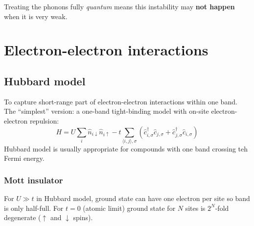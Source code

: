 \documentclass[11pt,letterpaper]{article}
\numberwithin{equation}{section} %
\newcommand{\spind}{\ensuremath{\downarrow}}
\newcommand{\spinu}{\ensuremath{\uparrow}}
\begin{document}
Treating the phonons fully \emph{quantum} means this instability may
\textbf{not happen} when it is very weak. 

\section{Electron-electron interactions}
\label{sec:electron_electron_interactions}
\subsection{Hubbard model}
\label{sub:hubbard_model}
To capture short-range part of electron-electron interactions within one
band. The ``simplest'' version: a one-band tight-binding model with on-site
electron-electron repulsion: 
\begin{equation}\label{eq:habbard} 
	H = U\sum_i \hat n_{i\spind}\hat n_{i\spinu} - t\sum_{\langle i, j\rangle,
	\sigma}\left( \hat c_{i, \sigma}^\dagger \hat c_{j,\sigma} + 
	\hat c_{j, \sigma}^\dagger \hat c_{i,\sigma}\right)
\end{equation}
Hubbard model is usually appropriate for compounds with one band crossing teh
Fermi energy. 

\subsubsection{Mott insulator}
\label{ssub:Mott insulator}
For $U\gg t$ in Hubbard model, ground state can have one electron per site so
band is only half-full. For $t=0$ (atomic limit) ground state for $N$ sites
is $2^N$-fold degenerate ($\spinu$ and $\spind$ spins). 
\end{document}
